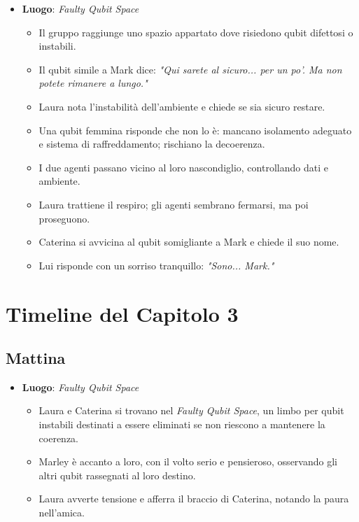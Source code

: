 \begin{itemize}
    \item \textbf{Luogo}: \emph{Faulty Qubit Space}
    \begin{itemize}
        \item Il gruppo raggiunge uno spazio appartato dove risiedono qubit difettosi o instabili.
        \item Il qubit simile a Mark dice: \emph{"Qui sarete al sicuro... per un po'. Ma non potete rimanere a lungo."}
        \item Laura nota l'instabilità dell'ambiente e chiede se sia sicuro restare.
        \item Una qubit femmina risponde che non lo è: mancano isolamento adeguato e sistema di raffreddamento; rischiano la decoerenza.
        \item I due agenti passano vicino al loro nascondiglio, controllando dati e ambiente.
        \item Laura trattiene il respiro; gli agenti sembrano fermarsi, ma poi proseguono.
        \item Caterina si avvicina al qubit somigliante a Mark e chiede il suo nome.
        \item Lui risponde con un sorriso tranquillo: \emph{"Sono... Mark."}
    \end{itemize}
\end{itemize}

\section*{Timeline del Capitolo 3}

\subsection*{Mattina}

\begin{itemize}
    \item \textbf{Luogo}: \emph{Faulty Qubit Space}
    \begin{itemize}
        \item Laura e Caterina si trovano nel \emph{Faulty Qubit Space}, un limbo per qubit instabili destinati a essere eliminati se non riescono a mantenere la coerenza.
        \item Marley è accanto a loro, con il volto serio e pensieroso, osservando gli altri qubit rassegnati al loro destino.
        \item Laura avverte tensione e afferra il braccio di Caterina, notando la paura nell'amica.
    \end{itemize}
\end{itemize}

